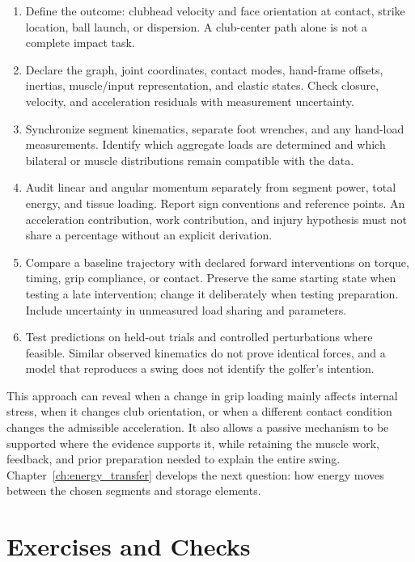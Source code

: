 \begin{enumerate}
\item Define the outcome: clubhead velocity and face orientation at contact,
      strike location, ball launch, or dispersion. A club-center path alone is
      not a complete impact task.
\item Declare the graph, joint coordinates, contact modes, hand-frame offsets,
      inertias, muscle/input representation, and elastic states. Check closure,
      velocity, and acceleration residuals with measurement uncertainty.
\item Synchronize segment kinematics, separate foot wrenches, and any hand-load
      measurements. Identify which aggregate loads are determined and which
      bilateral or muscle distributions remain compatible with the data.
\item Audit linear and angular momentum separately from segment power, total
      energy, and tissue loading. Report sign conventions and reference points.
      An acceleration contribution, work contribution, and injury hypothesis
      must not share a percentage without an explicit derivation.
\item Compare a baseline trajectory with declared forward interventions on
      torque, timing, grip compliance, or contact. Preserve the same starting
      state when testing a late intervention; change it deliberately when testing
      preparation. Include uncertainty in unmeasured load sharing and parameters.
\item Test predictions on held-out trials and controlled perturbations where
      feasible. Similar observed kinematics do not prove identical forces, and
      a model that reproduces a swing does not identify the golfer's intention.
\end{enumerate}

This approach can reveal when a change in grip loading mainly affects internal
stress, when it changes club orientation, or when a different contact condition
changes the admissible acceleration. It also allows a passive mechanism to be
supported where the evidence supports it, while retaining the muscle work,
feedback, and prior preparation needed to explain the entire swing.
Chapter~\ref{ch:energy_transfer} develops the next question: how energy moves
between the chosen segments and storage elements.

\section{Exercises and Checks}

